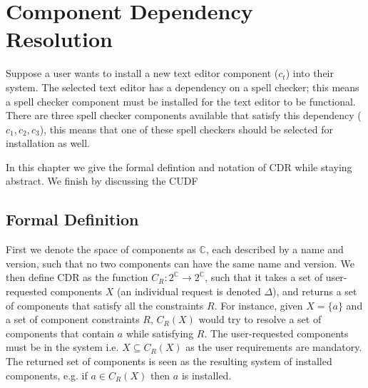 \chapter{Component Dependency Resolution}
\label{cdr}
Suppose a user wants to install a new text editor component ($c_t$) into their system.
The selected text editor has a dependency on a spell checker;
this means a spell checker component must be installed for the text editor to be functional.
There are three spell checker components available that satisfy this dependency ($c_1, c_2, c_3$),
this means that one of these spell checkers should be selected for installation as well.




In this chapter we give the formal defintion and notation of CDR while staying abstract. We finish by discussing the CUDF 
 
\section{Formal Definition}
First we denote the space of components as $\mathbb{C}$, each described by a name and version, such that no two components can have the same name and version.
We then define CDR as the function $C_R: 2^\mathbb{C} \rightarrow 2^\mathbb{C}$, 
such that it takes a set of user-requested components $X$ (an individual request is denoted $\Delta$),
and returns a set of components that satisfy all the constraints $R$.
For instance, given $X = \{a\}$ and a set of component constraints $R$,
$C_R(X)$ would try to resolve a set of components that contain $a$ while satisfying $R$.
The user-requested components must be in the system i.e. $X \subseteq C_R(X)$ as the user requirements are mandatory.
The returned set of components is seen as the resulting system of installed components, e.g. if $a \in C_R(X)$ then $a$ is installed.

